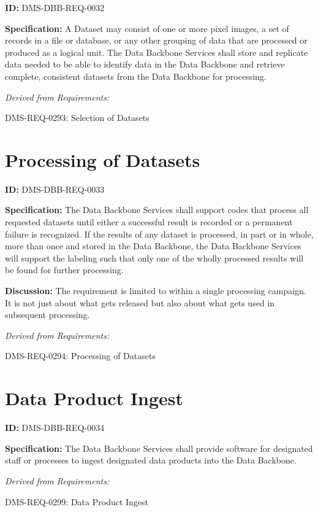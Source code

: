 \documentclass[SE,toc,lsstdraft]{lsstdoc}
\begin{document}
\label{DMS-DBB-REQ-0032}
\textbf{ID:} DMS-DBB-REQ-0032

\textbf{Specification:}
A Dataset may consist of one or more pixel images, a set of records in a file or database, or any other grouping of data that are processed or produced as a logical unit. The Data Backbone Services shall store and replicate data needed to be able to identify data in the Data Backbone and retrieve complete, consistent datasets from the Data Backbone for processing.

\emph{Derived from Requirements:}

DMS-REQ-0293:
Selection of Datasets \newline

\section{Processing of Datasets}

\label{DMS-DBB-REQ-0033}
\textbf{ID:} DMS-DBB-REQ-0033

\textbf{Specification:}
The Data Backbone Services shall support codes that process all requested datasets until either a successful result is recorded or a permanent failure is recognized. If the results of any dataset is processed, in part or in whole, more than once and stored in the Data Backbone, the Data Backbone Services will support the labeling such that only one of the wholly processed results will be found for further processing.

\textbf{Discussion:}
The requirement is limited to within a single processing campaign.   It is not just about what gets released but also about what gets used in subsequent processing.

\emph{Derived from Requirements:}

DMS-REQ-0294:
Processing of Datasets \newline

\section{Data Product Ingest}

\label{DMS-DBB-REQ-0034}
\textbf{ID:} DMS-DBB-REQ-0034

\textbf{Specification:}
The Data Backbone Services shall provide software for designated staff or processes to ingest designated data products into the Data Backbone.

\emph{Derived from Requirements:}

DMS-REQ-0299:
Data Product Ingest \newline
\end{document}
